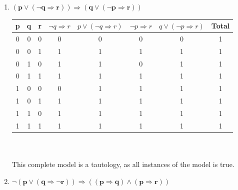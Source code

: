 \begin{large}
\begin{enumerate}
    \item $\mathbf{ (p \lor(\neg q \Rightarrow r)) \Rightarrow (q \lor (\neg p \Rightarrow r))} $

          \begin{tabular}{c|c|c|c|c|c|c||c}
            p & q & r & $ \neg q \Rightarrow r $ & $ p \lor (\neg q \Rightarrow r) $ & $ \neg p \Rightarrow r $ & $ q \lor (\neg p \Rightarrow r) $ & Total \\
            \hline\hline
            0 & 0 & 0 & 0                        & 0                                 & 0                        & 0                                 & 1     \\
            \hline
            0 & 0 & 1 & 1                        & 1                                 & 1                        & 1                                 & 1     \\
            \hline
            0 & 1 & 0 & 1                        & 1                                 & 0                        & 1                                 & 1     \\
            \hline
            0 & 1 & 1 & 1                        & 1                                 & 1                        & 1                                 & 1     \\
            \hline
            1 & 0 & 0 & 0                        & 1                                 & 1                        & 1                                 & 1     \\
            \hline
            1 & 0 & 1 & 1                        & 1                                 & 1                        & 1                                 & 1     \\
            \hline
            1 & 1 & 0 & 1                        & 1                                 & 1                        & 1                                 & 1     \\
            \hline
            1 & 1 & 1 & 1                        & 1                                 & 1                        & 1                                 & 1     \\
            \hline
          \end{tabular}
          \\ \\
          This complete model is a tautology, as all instances of the model is true.

    \item $\mathbf{ \neg(p \lor( q \Rightarrow \neg r)) \Rightarrow (( p \Rightarrow  q) \land ( p \Rightarrow  r)) }$


\end{enumerate}
\end{large}
